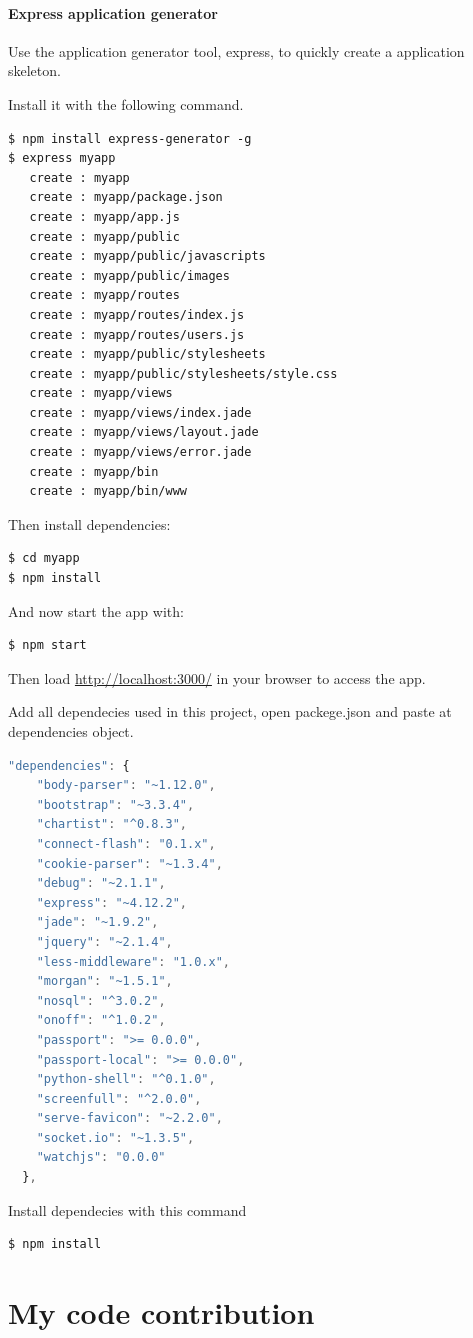 \paragraph*{Express application generator}
\hfill \break
Use the application generator tool, express, to quickly create a application skeleton.

Install it with the following command.
\begin{lstlisting}
$ npm install express-generator -g
$ express myapp
   create : myapp
   create : myapp/package.json
   create : myapp/app.js
   create : myapp/public
   create : myapp/public/javascripts
   create : myapp/public/images
   create : myapp/routes
   create : myapp/routes/index.js
   create : myapp/routes/users.js
   create : myapp/public/stylesheets
   create : myapp/public/stylesheets/style.css
   create : myapp/views
   create : myapp/views/index.jade
   create : myapp/views/layout.jade
   create : myapp/views/error.jade
   create : myapp/bin
   create : myapp/bin/www
\end{lstlisting}
Then install dependencies:
\begin{lstlisting}
$ cd myapp 
$ npm install
\end{lstlisting}
And now start the app with:
\begin{lstlisting}
$ npm start
\end{lstlisting}
Then load \url{http://localhost:3000/} in your browser to access the app.

Add all dependecies used in this project, open packege.json and paste at dependencies object.

\begin{lstlisting}[language=JavaScript]
  "dependencies": {
    "body-parser": "~1.12.0",
    "bootstrap": "~3.3.4",
    "chartist": "^0.8.3",
    "connect-flash": "0.1.x",
    "cookie-parser": "~1.3.4",
    "debug": "~2.1.1",
    "express": "~4.12.2",
    "jade": "~1.9.2",
    "jquery": "~2.1.4",
    "less-middleware": "1.0.x",
    "morgan": "~1.5.1",
    "nosql": "^3.0.2",
    "onoff": "^1.0.2",
    "passport": ">= 0.0.0",
    "passport-local": ">= 0.0.0",
    "python-shell": "^0.1.0",
    "screenfull": "^2.0.0",
    "serve-favicon": "~2.2.0",
    "socket.io": "~1.3.5",
    "watchjs": "0.0.0"
  },
\end{lstlisting}
Install dependecies with this command
\begin{lstlisting}
$ npm install
\end{lstlisting}

\section{My code contribution}
